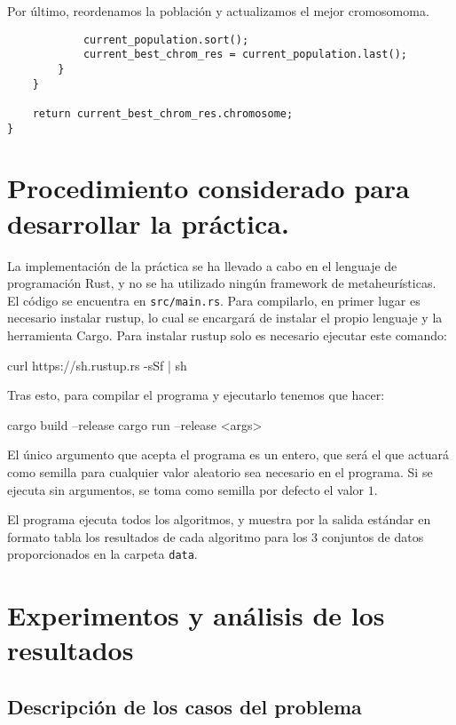 \documentclass[size=a4, parskip=half, titlepage=false, toc=flat, toc=bib, 12pt]{scrartcl}
\begin{document}
Por último, reordenamos la población y actualizamos el mejor cromosomoma.

\begin{verbatim}
            current_population.sort();
            current_best_chrom_res = current_population.last();
        }
    }

    return current_best_chrom_res.chromosome;
}
\end{verbatim}

\newpage
\section{Procedimiento considerado para desarrollar la práctica.}
La implementación de la práctica se ha llevado a cabo en el lenguaje de programación Rust, y no se ha utilizado ningún framework de metaheurísticas.\\

El código se encuentra en \texttt{src/main.rs}. Para compilarlo, en primer lugar es necesario instalar rustup, lo cual se encargará de instalar el propio lenguaje y la herramienta Cargo. Para instalar rustup solo es necesario ejecutar este comando:
\begin{shell}
curl https://sh.rustup.rs -sSf | sh
\end{shell}

Tras esto, para compilar el programa y ejecutarlo tenemos que hacer:
\begin{shell}
cargo build --release
cargo run --release <args>
\end{shell}

El único argumento que acepta el programa es un entero, que será el que actuará como semilla para cualquier valor aleatorio sea necesario en el programa. Si se ejecuta sin argumentos, se toma como semilla por defecto el valor $1$.

El programa ejecuta todos los algoritmos, y muestra por la salida estándar en formato tabla los resultados de cada algoritmo para los 3 conjuntos de datos proporcionados en la carpeta \texttt{data}.

\newpage

\section{Experimentos y análisis de los resultados}
\subsection{Descripción de los casos del problema}
\end{document}
